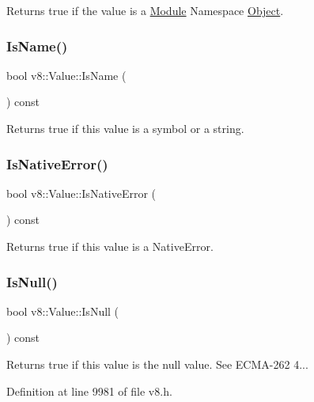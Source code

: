 Returns true if the value is a \mbox{\hyperlink{classv8_1_1Module}{Module}} Namespace \mbox{\hyperlink{classv8_1_1Object}{Object}}. \mbox{\label{classv8_1_1Value_a1ae3d5f5823705d2b6c26378201b772b}} 
\subsubsection{\texorpdfstring{Is\+Name()}{IsName()}}
{\footnotesize\ttfamily bool v8\+::\+Value\+::\+Is\+Name (\begin{DoxyParamCaption}{ }\end{DoxyParamCaption}) const}

Returns true if this value is a symbol or a string. \mbox{\label{classv8_1_1Value_a7dc01ab1db65640f774366e8ecab91df}} 
\subsubsection{\texorpdfstring{Is\+Native\+Error()}{IsNativeError()}}
{\footnotesize\ttfamily bool v8\+::\+Value\+::\+Is\+Native\+Error (\begin{DoxyParamCaption}{ }\end{DoxyParamCaption}) const}

Returns true if this value is a Native\+Error. \mbox{\label{classv8_1_1Value_a7710cf2aca870e961f1df65ef6057eb4}} 
\subsubsection{\texorpdfstring{Is\+Null()}{IsNull()}}
{\footnotesize\ttfamily bool v8\+::\+Value\+::\+Is\+Null (\begin{DoxyParamCaption}{ }\end{DoxyParamCaption}) const}

Returns true if this value is the null value. See E\+C\+M\+A-\/262 4... 

Definition at line 9981 of file v8.\+h.

\mbox{\label{classv8_1_1Value_a47bb1e442bf9741e9e29468659e8cdba}} 
